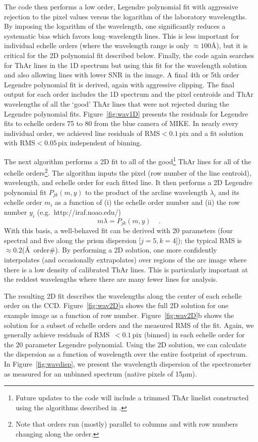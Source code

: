 \documentclass[12pt,preprint]{aastex}
\begin{document}
The code then performs a low order, Legendre polynomial
fit with aggressive rejection
to the pixel values versus the logarithm of the laboratory
wavelengths.  By imposing the logarithm of the wavelength, 
one significantly reduces a systematic bias 
which favors long--wavelength lines.
This is less important for individual echelle 
orders (where the wavelength range is only
$\approx 100$\AA), but it is critical for the 2D polynomial
fit described below.
Finally, the code again searches for ThAr lines in the 1D
spectrum but using this fit for the wavelength solution and also
allowing lines with lower SNR in the image.  A final 4th or 5th
order Legendre polynomial fit is derived, again with aggressive
clipping.  The final output for each order
includes the 1D spectrum and the pixel centroids and ThAr wavelengths
of all the `good' ThAr lines that were not rejected during
the Legendre polynomial fits.
Figure~\ref{fig:wav1D} presents the residuals for Legendre
fits to echelle orders 75 to 80 from the blue camera of MIKE.
In nearly every individual order, we achieved line residuals 
of RMS$<0.1$\,pix
and a fit solution with RMS$<0.05$\,pix independent of binning.


The next algorithm performs a 2D fit to all of the good\footnote{Future
updates to the code will include a trimmed ThAr linelist
constructed using the algorithms described in \cite{murphy07}.}
ThAr lines for all of the echelle orders\footnote{Note 
that orders run (mostly) parallel to columns
and with row numbers changing along the order.}. 
The algorithm inputs the pixel (row
number of the line centroid), 
wavelength, and echelle order for each fitted line. 
It then performs a 2D Legendre
polynomial fit $P_{jk}(m,y)$
to the product of the arcline wavelength $\lambda_i$ and its
echelle order $m_i$ as a function of 
(i) the echelle order number and (ii)
the row number $y_i$ (e.g.\ http://iraf.noao.edu/)
\begin{equation}
m \lambda = P_{jk}(m, y) \;\;\;\; .
\end{equation}
With this basis, a well-behaved fit can be derived with 20 
parameters (four spectral and five along the prism dispersion [$j=5,k=4$]);
the typical RMS is $\approx 0.2$(\AA\ order\#).
By performing a 2D solution, one more confidently interpolates
(and occasionally extrapolates)
over regions of the arc image where there is a low density of 
calibrated ThAr lines.
This is particularly important at the reddest wavelengths
where there are many fewer lines for analysis. 

The resulting 2D fit describes the wavelengths along the 
center of each echelle order on the CCD.
Figure~\ref{fig:wav2D}a shows the full 2D solution for one example
image as a function of row number.
Figure~\ref{fig:wav2D}b shows the solution for a subset of 
echelle orders and the measured RMS of the fit.  Again, we
generally achieve residuals of RMS~$< 0.1$\,pix (binned) in each
echelle order for the 20 parameter Legendre polynomial.
Using the 2D solution, we can calculate the
dispersion as a function of wavelength over the entire footprint 
of spectrum. In Figure~\ref{fig:wavdisp}, we present the wavelength dispersion
of the spectrometer as measured for an unbinned spectrum
(native pixels of 15$\mu$m). 
\end{document}

